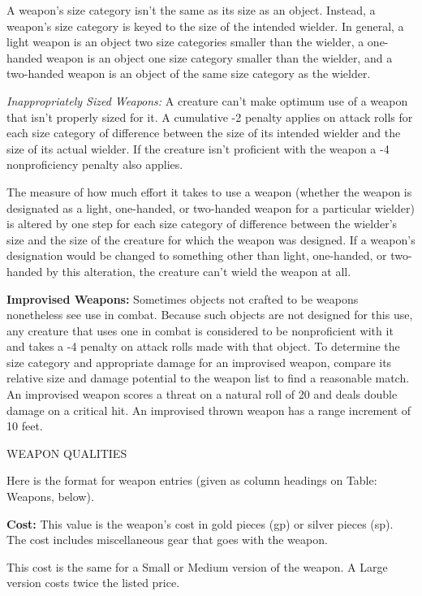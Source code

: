 \documentclass{article}
\begin{document}
A weapon's size category isn't the same as its size as an object. Instead, a weapon's 
size category is keyed to the size of the intended wielder. In general, a light 
weapon is an object two size categories smaller than the wielder, a one-handed 
weapon is an object one size category smaller than the wielder, and a two-handed 
weapon is an object of the same size category as the wielder.

\textit{Inappropriately Sized Weapons: }A creature can't make optimum use of a 
weapon that isn't properly sized for it. A cumulative -2 penalty applies on attack 
rolls for each size category of difference between the size of its intended wielder 
and the size of its actual wielder. If the creature isn't proficient with the weapon 
a -4 nonproficiency penalty also applies.

The measure of how much effort it takes to use a weapon (whether the weapon is 
designated as a light, one-handed, or two-handed weapon for a particular wielder) 
is altered by one step for each size category of difference between the wielder's 
size and the size of the creature for which the weapon was designed. If a weapon's 
designation would be changed to something other than light, one-handed, or two-handed 
by this alteration, the creature can't wield the weapon at all.

\vspace{12pt}
\textbf{Improvised Weapons:} Sometimes objects not crafted to be weapons nonetheless 
see use in combat. Because such objects are not designed for this use, any creature 
that uses one in combat is considered to be nonproficient with it and takes a -4 
penalty on attack rolls made with that object. To determine the size category and 
appropriate damage for an improvised weapon, compare its relative size and damage 
potential to the weapon list to find a reasonable match. An improvised weapon scores 
a threat on a natural roll of 20 and deals double damage on a critical hit. An 
improvised thrown weapon has a range increment of 10 feet.

\vspace{12pt}
WEAPON QUALITIES

Here is the format for weapon entries (given as column headings on Table: Weapons, 
below).

\textbf{Cost:} This value is the weapon's cost in gold pieces (gp) or silver pieces 
(sp). The cost includes miscellaneous gear that goes with the weapon.

This cost is the same for a Small or Medium version of the weapon. A Large version 
costs twice the listed price.
\end{document}
